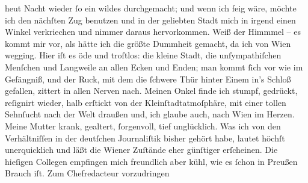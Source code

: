 \begin{ledgroupsized}[t]{13cm}
                  heut{ }Nacht wieder ſo ein wildes \label{K_L02660-1v}\label{K_L02660-1h} durchgemacht; und wenn ich feig wäre, möchte ich den nächſten Zug
               benutzen und in der geliebten Stadt mich in irgend einen Winkel verkriechen und nimmer daraus
               hervorkommen. Weiß der Himmmel – es kommt mir vor, als hätte ich die größte Dummheit
               gemacht, da ich von Wien wegging. Hier iſt es öde
               und troſtlos: die kleine Stadt,
               die unſympathiſchen Menſchen und Langweile an allen Ecken und Enden; man kommt ſich
               vor wie im Gefängniß, und der Ruck, mit dem {\pb}die
               ſchwere Thür hinter Einem in’s Schloß gefallen, zittert in allen Nerven nach. Meinen
                  Onkel finde ich stumpf,
               gedrückt, reſignirt wieder, halb erſtickt von der Kleinſtadtatmoſphäre, mit einer
               tollen Sehnſucht nach der Welt draußen und, ich glaube auch, nach Wien im Herzen. Meine Mutter krank, gealtert, ſorgenvoll, tief unglücklich. Was ich
               von den Verhältniſſen in der deutſchen Journaliſtik bisher gehört habe, lautet höchſt
               unerquicklich und läßt die Wiener Zuſtände eher
               günſtiger erſcheinen. Die hieſigen Collegen empfingen mich freundlich aber kühl, wie
               es ſchon in Preußen Brauch iſt. Zum Chefredacteur vorzudringen

\end{ledgroupsized}
